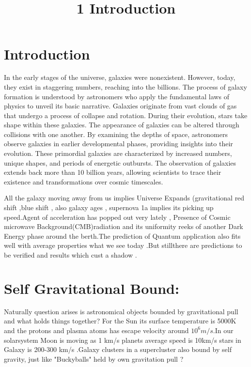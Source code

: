 \documentclass[10pt]{article}
\title{1 Introduction }
\author{}
\date{}
\begin{document}
\maketitle
\section{Introduction}
In the early stages of the universe, galaxies were nonexistent. However, today, they exist in staggering numbers, reaching into the billions. The process of galaxy formation is understood by astronomers who apply the fundamental laws of physics to unveil its basic narrative. Galaxies originate from vast clouds of gas that undergo a process of collapse and rotation. During their evolution, stars take shape within these galaxies. The appearance of galaxies can be altered through collisions with one another. By examining the depths of space, astronomers observe galaxies in earlier developmental phases, providing insights into their evolution. These primordial galaxies are characterized by increased numbers, unique shapes, and periods of energetic outbursts. The observation of galaxies extends back more than 10 billion years, allowing scientists to trace their existence and transformations over cosmic timescales.

All the galaxy moving away from us implies Universe Expands (gravitational red shift ,blue shift , also galaxy ages , supernova 1a implies its picking up speed.Agent of acceleration has popped out very lately , Presence of Cosmic microwave Background(CMB)radiation and its uniformity reeks of another Dark Energy phase around the berth.The prediction of Quantum application also fits well with average properties what we see today .But stillthere are predictions to be verified and results which cust a shadow .
\section{Self Gravitational Bound:} 

Naturally question arises is astronomical objects bounded by gravitational pull and what holds things together? For the Sun its surface temperature is 5000K and the protons and plasma atoms has escape velocity around $10^{6} m/s$.In our solarsystem 
Moon is moving as 1 km/s planets average speed is 10km/s stars in Galaxy is 200-300 km/s .Galaxy clusters in a  supercluster also bound by self gravity, just like "Buckyballs" held by own gravitation pull ?
\end{document}
